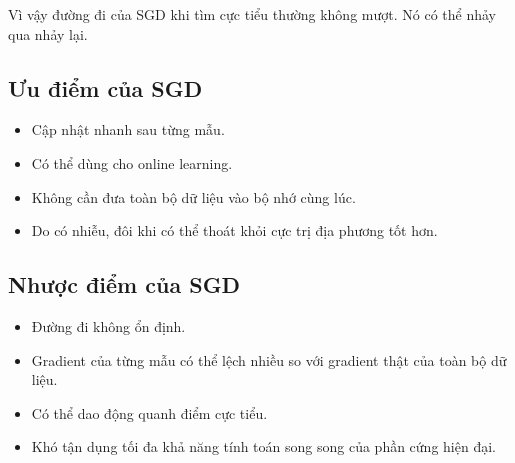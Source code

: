Vì vậy đường đi của SGD khi tìm cực tiểu thường không mượt. Nó có thể nhảy qua nhảy lại.

\begin{center}
\end{center}

\subsection{Ưu điểm của SGD}

\begin{itemize}
    \item Cập nhật nhanh sau từng mẫu.
    \item Có thể dùng cho online learning.
    \item Không cần đưa toàn bộ dữ liệu vào bộ nhớ cùng lúc.
    \item Do có nhiễu, đôi khi có thể thoát khỏi cực trị địa phương tốt hơn.
\end{itemize}

\subsection{Nhược điểm của SGD}

\begin{itemize}
    \item Đường đi không ổn định.
    \item Gradient của từng mẫu có thể lệch nhiều so với gradient thật của toàn bộ dữ liệu.
    \item Có thể dao động quanh điểm cực tiểu.
    \item Khó tận dụng tối đa khả năng tính toán song song của phần cứng hiện đại.
\end{itemize}


